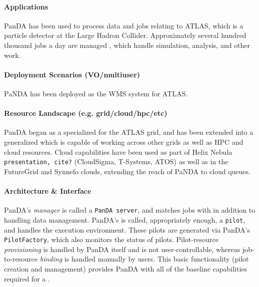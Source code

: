 \documentclass{sig-alternate}
\begin{document}
\paragraph{Applications}
PanDA has been used to process data and jobs relating to ATLAS, which is
a particle detector at the Large Hadron Collider.  Approximately
several hundred thousand jobs a day are managed , which handle
simulation, analysis, and other work.  

\paragraph{Deployment Scenarios (VO/multiuser)}
PaNDA has been deployed as the WMS system for ATLAS.  

\paragraph{Resource Landscape (e.g. grid/cloud/hpc/etc)}
PanDA began as a specialized \pilotjob for the ATLAS grid, and has been extended
into a generalized \pilotjob which is capable of working across other grids
as well as HPC and cloud resources.  
Cloud capabilities have been used as part
of Helix Nebula \texttt{presentation, cite?} (CloudSigma, T-Systems, ATOS) as well
as in the FutureGrid and Synnefo clouds, extending the reach of PaNDA to
cloud queues.  

\paragraph{Architecture \& Interface}
PanDA's \textit{manager} is called a \texttt{PanDA server}, and matches
jobs with \pilots in addition to handling data management.
PanDA's \textit{\pilot}
is called, appropriately enough, a \texttt{pilot}, and handles the execution
environment.  These pilots are generated via PanDA's \texttt{PilotFactory},
which also monitors the status of pilots.
Pilot-resource \textit{provisioning} is handled by PanDA itself and is not 
user-controllable, whereas job-to-resource \textit{binding} is handled
manually by users.
This basic functionality (pilot creation and management) provides 
PanDA with all of the baseline capabilities required for a \pilotjob.
\end{document}
